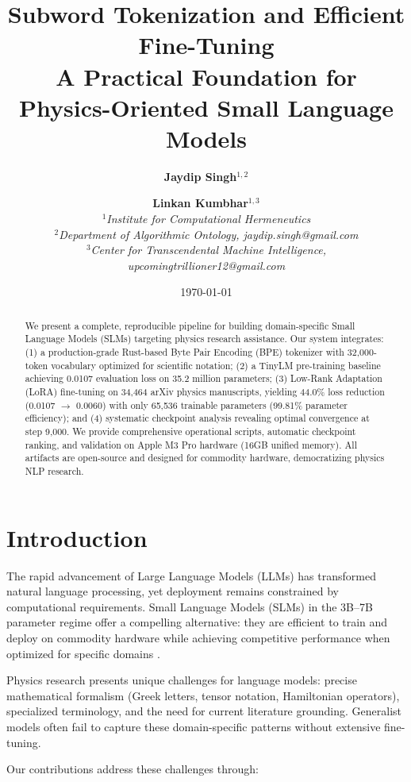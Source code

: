 \documentclass[11pt,a4paper,twocolumn]{article}
\title{\textbf{Subword Tokenization and Efficient Fine-Tuning}\\ 
\large A Practical Foundation for Physics-Oriented Small Language Models}
\author{
    \textbf{Jaydip Singh}$^{1,2}$ \and 
    \textbf{Linkan Kumbhar}$^{1,3}$ \\
    $^{1}$\textit{Institute for Computational Hermeneutics} \\
    $^{2}$\textit{Department of Algorithmic Ontology, jaydip.singh@gmail.com} \\
    $^{3}$\textit{Center for Transcendental Machine Intelligence, upcomingtrillioner12@gmail.com}
}
\date{\today}
\theoremstyle{plain}
\theoremstyle{definition}
\begin{document}
\maketitle

\begin{abstract}
We present a complete, reproducible pipeline for building domain-specific 
Small Language Models (SLMs) targeting physics research assistance. Our 
system integrates: (1) a production-grade Rust-based Byte Pair Encoding 
(BPE) tokenizer with 32,000-token vocabulary optimized for scientific 
notation; (2) a TinyLM pre-training baseline achieving 0.0107 evaluation 
loss on 35.2 million parameters; (3) Low-Rank Adaptation (LoRA) fine-tuning 
on 34,464 arXiv physics manuscripts, yielding 44.0\% loss reduction 
(0.0107 $\rightarrow$ 0.0060) with only 65,536 trainable parameters 
(99.81\% parameter efficiency); and (4) systematic checkpoint analysis 
revealing optimal convergence at step 9,000. We provide comprehensive 
operational scripts, automatic checkpoint ranking, and validation on 
Apple M3 Pro hardware (16GB unified memory). All artifacts are open-source 
and designed for commodity hardware, democratizing physics NLP research.
\end{abstract}

\section{Introduction}

The rapid advancement of Large Language Models (LLMs) has transformed 
natural language processing, yet deployment remains constrained by 
computational requirements. Small Language Models (SLMs) in the 
3B--7B parameter regime offer a compelling alternative: they are 
efficient to train and deploy on commodity hardware while achieving 
competitive performance when optimized for specific domains 
\citep{eldan2023tinystories}. 

Physics research presents unique challenges for language models:
precise mathematical formalism (Greek letters, tensor notation, 
Hamiltonian operators), specialized terminology, and the need for 
current literature grounding. Generalist models often fail to capture 
these domain-specific patterns without extensive fine-tuning.

Our contributions address these challenges through:
\end{document}

